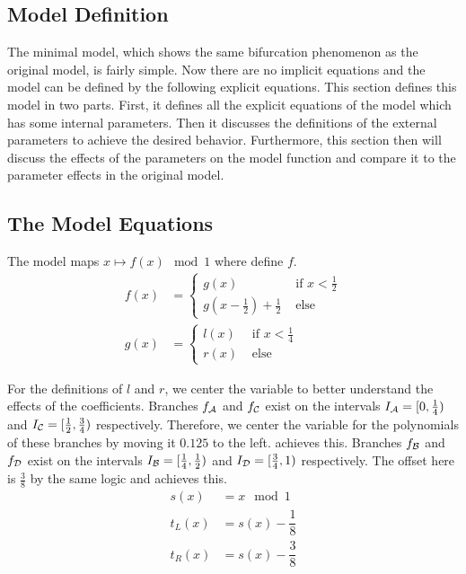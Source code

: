 \subsection{Model Definition}
\label{sec:minrep.definition}

The minimal model, which shows the same bifurcation phenomenon as the original model, is fairly simple.
Now there are no implicit equations and the model can be defined by the following explicit equations.
This section defines this model in two parts.
First, it defines all the explicit equations of the model which has some internal parameters.
Then it discusses the definitions of the external parameters to achieve the desired behavior.
Furthermore, this section then will discuss the effects of the parameters on the model function and compare it to the parameter effects in the original model.

\subsection{The Model Equations}

The model maps $x \mapsto f(x) \mod 1$ where  define $f$.
\begin{align}
	f(x) & = \begin{cases}
		         g(x)                                        & \text{ if } x < \frac{1}{2} \\
		         g\left(x - \frac{1}{2}\right) + \frac{1}{2} & \text{ else}
	         \end{cases}
	\label{equ:final.def.f}
	\\
	g(x) & = \begin{cases}
		         l(x) & \text{ if } x < \frac{1}{4} \\
		         r(x) & \text{ else}
	         \end{cases}
\end{align}

For the definitions of $l$ and $r$, we center the variable to better understand the effects of the coefficients.
Branches $f_{\mathcal{A}}$ and $f_{\mathcal{C}}$ exist on the intervals $I_{\mathcal{A}} = [0, \frac{1}{4})$ and $I_{\mathcal{C}} = [\frac{1}{2}, \frac{3}{4})$ respectively.
Therefore, we center the variable for the polynomials of these branches by moving it $0.125$ to the left.
 achieves this.
Branches $f_{\mathcal{B}}$ and $f_{\mathcal{D}}$ exist on the intervals $I_{\mathcal{B}} = [\frac{1}{4}, \frac{1}{2})$ and $I_{\mathcal{D}} = [\frac{3}{4}, 1)$ respectively.
The offset here is $\frac{3}{8}$ by the same logic and  achieves this.
\begin{align}
	s(x)   & = x \mod 1                                     \\
	t_L(x) & = s(x) - \dfrac{1}{8} \label{equ:final.def.tl} \\
	t_R(x) & = s(x) - \dfrac{3}{8} \label{equ:final.def.tr}
\end{align}

